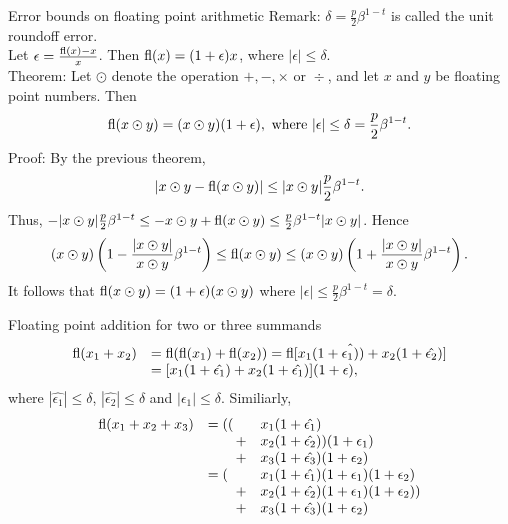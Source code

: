 \documentclass{beamer}
\begin{document}
\begin{frame}{Error bounds on floating point arithmetic}
Remark: $\delta = \frac{p}{2} \beta^{1-t}$ is called the unit roundoff error.\\
Let $\epsilon = \frac{\text{fl}(x) - x}{x}$. Then $\text{fl}(x) = (1 + \epsilon) x$, where $|\epsilon| \leq \delta$.\\
Theorem: Let $\odot$ denote the operation $+, -, \times \text{ or } \div$, and let $x$ and $y$ be
floating point numbers. Then
\begin{equation*}
\text{fl}(x \odot y) = (x \odot y)(1 + \epsilon), \text{ where } |\epsilon| \leq \delta = \frac{p}{2} \beta^{1-t}.
\end{equation*}
Proof: By the previous theorem,
\begin{equation*}
|x \odot y - \text{fl}(x \odot y)| \leq |x \odot y| \frac{p}{2} \beta^{1-t}.
\end{equation*}
Thus, $-|x \odot y| \frac{p}{2} \beta^{1 - t} \leq -x \odot y + \text{fl}(x \odot y) \leq \frac{p}{2} \beta^{1 - t} |x \odot y|$.
Hence
\begin{equation*}
(x \odot y)\left(1 - \frac{|x \odot y|}{x \odot y} \beta^{1-t} \right) \leq \text{fl}(x \odot y) \leq 
(x \odot y)\left(1 + \frac{|x \odot y|}{x \odot y} \beta^{1-t}\right).
\end{equation*}
It follows that $\text{fl}(x \odot y) = (1 + \epsilon) (x \odot y)$ where
$|\epsilon| \leq \frac{p}{2} \beta^{1-t} = \delta$.
\end{frame}


\begin{frame}{Floating point addition for two or three summands}
\begin{equation*}
\begin{array}{rl}
\text{fl}(x_1 + x_2) &= \text{fl}(\text{fl}(x_1) + \text{fl}(x_2)) = \text{fl}[x_1(1 + \hat{\epsilon_1)}) + x_2(1 + \hat{\epsilon_2})] \\
&= [x_1 (1 + \hat{\epsilon_1}) + x_2 (1 + \hat{\epsilon_1})] (1 + \epsilon),
\end{array}
\end{equation*}
where
$|\hat{\epsilon_1}| \leq \delta$, $|\hat{\epsilon_2}| \leq \delta$ and $|\epsilon_1| \leq \delta$. Similiarly,
\begin{equation*}
\begin{array}{rll}
\text{fl}(x_1 + x_2 + x_3) &= ((&x_1 (1 + \hat{\epsilon_1})\\
&\qquad + &x_2 (1 + \hat{\epsilon_2}))(1 + \epsilon_1)\\
&\qquad +  &x_3 (1 + \hat{\epsilon_3})(1 + \epsilon_2) \\
& = (&x_1 (1 + \hat{\epsilon_1}) (1 + \epsilon_1) (1 + \epsilon_2) \\
	&\qquad + &x_2 (1 + \hat{\epsilon_2}) (1 + \epsilon_1) (1 + \epsilon_2)) \\
	&\qquad + &x_3 (1 + \hat{\epsilon_3}) (1 + \epsilon_2)
\end{array}
\end{equation*}
\end{frame}
\end{document}
